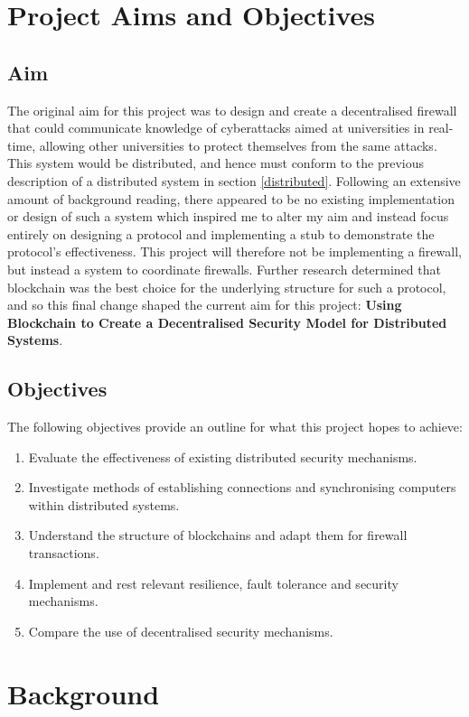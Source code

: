 \documentclass[a4paper, 12pt]{report}
\begin{document}
\chapter{Project Aims and Objectives}

\section{Aim}
The original aim for this project was to design and create a decentralised firewall that could communicate knowledge of cyberattacks aimed at universities in real-time, allowing other universities to protect themselves from the same attacks. This system would be distributed, and hence must conform to the previous description of a distributed system in section \ref{distributed}. Following an extensive amount of background reading, there appeared to be no existing implementation or design of such a system which inspired me to alter my aim and instead focus entirely on designing a protocol and implementing a \gls{stub} to demonstrate the protocol's effectiveness. This project will therefore not be implementing a firewall, but instead a system to coordinate firewalls. Further research determined that \gls{blockchain} was the best choice for the underlying structure for such a protocol, and so this final change shaped the current aim for this project: \textbf{Using Blockchain to Create a Decentralised Security Model for Distributed Systems}.

\section{Objectives}
The following objectives provide an outline for what this project hopes to achieve:

\begin{enumerate}
    \item Evaluate the effectiveness of existing distributed security mechanisms.
    \item Investigate methods of establishing connections and synchronising computers within distributed systems.
    \item Understand the structure of \gls{blockchain}s and adapt them for firewall transactions.
    \item Implement and rest relevant resilience, fault tolerance and security mechanisms.
    \item Compare the use of decentralised security mechanisms.
\end{enumerate}

\chapter{Background}

\printglossaries

 

\end{document}
